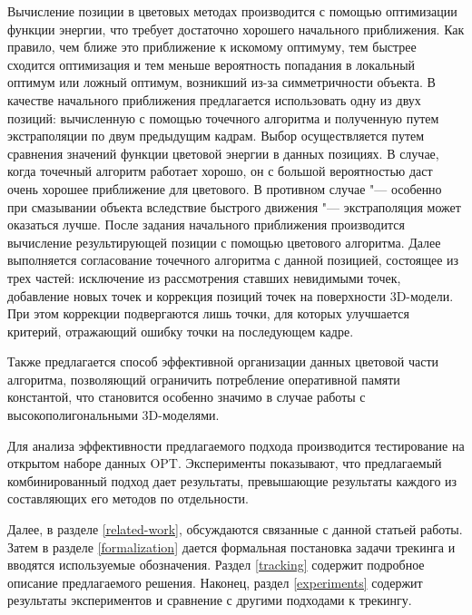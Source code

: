 Вычисление позиции в цветовых методах производится с помощью оптимизации
функции энергии, что требует достаточно хорошего начального приближения.
Как правило, чем ближе это приближение к искомому оптимуму, тем быстрее
сходится оптимизация и тем меньше вероятность попадания в локальный оптимум или
ложный оптимум, возникший из-за симметричности объекта.
В качестве начального приближения предлагается использовать одну из двух
позиций: вычисленную с помощью точечного алгоритма и полученную путем
экстраполяции по двум предыдущим кадрам.
Выбор осуществляется путем сравнения значений функции цветовой энергии в данных
позициях.
В случае, когда точечный алгоритм работает хорошо, он с большой вероятностью
даст очень хорошее приближение для цветового.
В противном случае "--- особенно при смазывании объекта вследствие
быстрого движения "--- экстраполяция может оказаться лучше.
После задания начального приближения производится вычисление результирующей
позиции с помощью цветового алгоритма.
Далее выполняется согласование точечного алгоритма с данной позицией, состоящее
из трех частей: исключение из рассмотрения ставших невидимыми точек,
добавление новых точек и коррекция позиций точек на поверхности 3D-модели.
При этом коррекции подвергаются лишь точки, для которых улучшается
критерий, отражающий ошибку точки на последующем кадре.

Также предлагается способ эффективной организации данных цветовой части
алгоритма, позволяющий ограничить потребление оперативной памяти константой,
что становится особенно значимо в случае работы с высокополигональными
3D-моделями.


Для анализа эффективности предлагаемого подхода производится тестирование
на открытом наборе данных OPT\cite{OPT}.
Эксперименты показывают, что предлагаемый комбинированный подход дает
результаты, превышающие результаты каждого из составляющих его методов по
отдельности.


Далее, в разделе \ref{related-work}, обсуждаются связанные с данной статьей
работы.
Затем в разделе \ref{formalization} дается формальная постановка задачи
трекинга и вводятся используемые обозначения.
Раздел \ref{tracking} содержит подробное описание предлагаемого решения.
Наконец, раздел \ref{experiments} содержит результаты экспериментов и сравнение
с другими подходами к трекингу.
